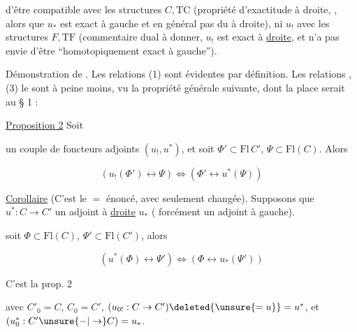 
d'être compatible avec les structures $C,\mathrm{TC}$ (propriété d'exactitude  à droite, , alors que $u_*$ est exact à gauche et  en général pas du  à droite), ni $u_!$ avec les structures $F,\mathrm{TF}$ (commentaire dual à donner, $u_!$ est exact à \uline{droite}, et n'a pas envie d'être ``homotopiquement exact à gauche'').

Démonstration de . Les relations (1) sont évidentes par définition. Les relations , (3) le sont à peine moins, vu la propriété  générale suivante, dont la place serait au § 1 :

\uline{Proposition 2} Soit


un couple de foncteurs adjoints $(u_!,u^*)$, et soit $\Phi'\subset\mathrm{Fl}\,C'$, $\Psi\subset\mathrm{Fl}(C)$. Alors

\[ (u_!(\Phi')\longleftrightarrow\Psi)\Longleftrightarrow(\Phi'\longleftrightarrow u^*(\Psi)) \]

\uline{Corollaire} (C'est le $=$ énoncé, avec seulement   changée). Supposons que $u^*:C\to C'$  un adjoint à \uline{droite} $u_*$ ( forcément un adjoint à gauche).


soit $\Phi\subset\mathrm{Fl}(C)$, $\Psi'\subset\mathrm{Fl}(C')$, alors

\[ (u^*(\Phi)\longleftrightarrow\Psi')\Longleftrightarrow(\Phi\longleftrightarrow u_*(\Psi')) \]

C'est la prop. 2   


 avec $C'_0=C$, $C_0=C'$, $(u_{0!}:C\to C')\deleted{\unsure{=u}}=u^*$, et $(u_0^*:C'\unsure{-|\to}C)=u_*$.
